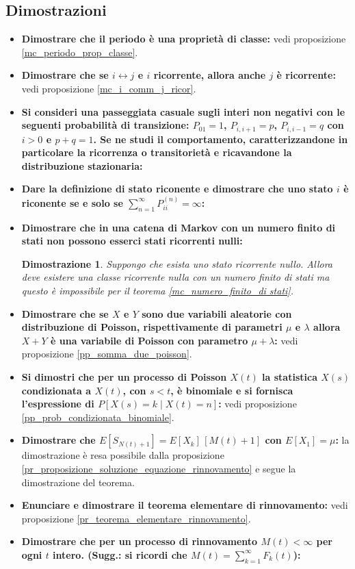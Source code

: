 \documentclass{article}
\newtheorem*{dimostrazione*}{Dimostrazione}
\begin{document}
\subsection{Dimostrazioni}
\begin{itemize}
    \item \textbf{Dimostrare che il periodo è una proprietà di classe:} vedi proposizione \ref{mc_periodo_prop_classe}.

    \item \textbf{Dimostrare che se $i \leftrightarrow j$ e $i$ ricorrente, allora anche $j$ è ricorrente:} vedi proposizione \ref{mc_i_comm_j_ricor}.

    \item \textbf{Si consideri una passeggiata casuale sugli interi non negativi con le seguenti probabilità di transizione: $P_{01} = 1$, $P_{i,i+1} = p$, $P_{i,i-1} = q$ con $i > 0$ e $p+q = 1$. Se ne studi il comportamento, caratterizzandone in particolare la ricorrenza o transitorietà e ricavandone la distribuzione stazionaria:}

    \item \textbf{Dare la definizione di stato riconente e dimostrare che uno stato $i$ è riconente se e solo se $\sum_{n=1}^{\infty}P_{ii}^{(n)}=\infty$:}

    \item \textbf{Dimostrare che in una catena di Markov con un numero finito di stati non possono esserci stati ricorrenti nulli:}
    \begin{dimostrazione*}
    Suppongo che esista uno stato ricorrente nullo. Allora deve esistere una classe ricorrente nulla con un numero finito di stati ma questo è impossibile per il teorema \ref{mc_numero_finito_di stati}.
    \end{dimostrazione*}

    \item \textbf{Dimostrare che se $X$ e $Y$ sono due variabili aleatorie con distribuzione di Poisson, rispettivamente di parametri $\mu$ e $\lambda$ allora $X+Y$ è una variabile di Poisson con parametro $\mu + \lambda$:} vedi proposizione \ref{pp_somma_due_poisson}.

    \item \textbf{Si dimostri che per un processo di Poisson $X(t)$ la statistica $X(s)$ condizionata a $X(t)$, con $s<t$, è binomiale e si fornisca l'espressione di $P[X(s) = k\mid X(t) = n]$:} vedi proposizione \ref{pp_prob_condizionata_binomiale}.

    \item \textbf{Dimostrare che $E[S_{N(t) + 1}] = E[X_k]\,[M(t) + 1]$ con $E[X_1] = \mu$:} la dimostrazione è resa possibile dalla proposizione \ref{pr_proposizione_soluzione_equazione_rinnovamento} e segue la dimostrazione del teorema.

    \item \textbf{Enunciare e dimostrare il teorema elementare di rinnovamento:} vedi proposizione \ref{pr_teorema_elementare_rinnovamento}.

    \item \textbf{Dimostrare che per un processo di rinnovamento $M(t) < \infty$ per ogni $t$ intero. (Sugg.: si ricordi che $M(t) = \sum_{k=1}^{\infty}F_k(t)$):}
\end{itemize}
\end{document}
